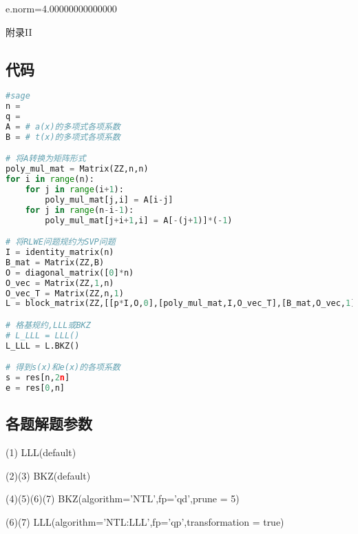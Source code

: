 \documentclass[12pt,a4paper]{article}
\numberwithin{equation}{section}
\begin{document}
e.norm=4.00000000000000

\hspace*{\fill}

{\centering\heiti\fontsize{14pt}{21pt}\selectfont 附录II \; \par}
\vspace{1em}
\setcounter{subsection}{0}
\renewcommand{\thesubsection}{\arabic{subsection}}
\subsection{代码}

\begin{lstlisting}[language=Python]
#sage
n = 
q = 
A = # a(x)的多项式各项系数
B = # t(x)的多项式各项系数

# 将A转换为矩阵形式
poly_mul_mat = Matrix(ZZ,n,n)
for i in range(n):
    for j in range(i+1):
        poly_mul_mat[j,i] = A[i-j]
    for j in range(n-i-1):
        poly_mul_mat[j+i+1,i] = A[-(j+1)]*(-1)

# 将RLWE问题规约为SVP问题
I = identity_matrix(n)
B_mat = Matrix(ZZ,B)
O = diagonal_matrix([0]*n)
O_vec = Matrix(ZZ,1,n)
O_vec_T = Matrix(ZZ,n,1)
L = block_matrix(ZZ,[[p*I,O,0],[poly_mul_mat,I,O_vec_T],[B_mat,O_vec,1]]) # kannan embedding

# 格基规约,LLL或BKZ
# L_LLL = LLL()
L_LLL = L.BKZ()

# 得到s(x)和e(x)的各项系数
s = res[n,2n]
e = res[0,n]
\end{lstlisting}

\subsection{各题解题参数}

(1) LLL(default)

(2)(3) BKZ(default)

(4)(5)(6)(7) BKZ(algorithm='NTL',fp='qd',prune = 5)

(6)(7) LLL(algorithm='NTL:LLL',fp='qp',transformation = true)

\vspace{1em}

{\songti\fontsize{12pt}{18pt}\selectfont
	
}
%
\end{document}
